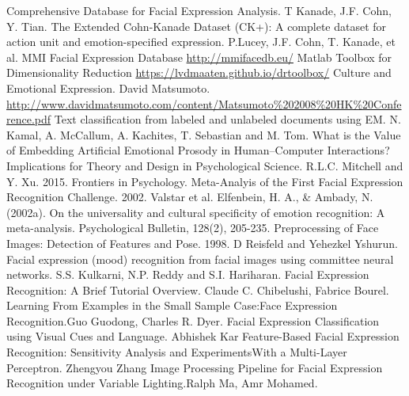 \documentclass[10pt,twocolumn,letterpaper]{article}
\begin{document}
\begin{thebibliography}{1}
 Comprehensive Database for Facial Expression Analysis. T Kanade, J.F. Cohn, Y. Tian.
 The Extended Cohn-Kanade Dataset (CK+): A complete dataset for action unit and emotion-specified expression. P.Lucey, J.F. Cohn, T. Kanade, et al. 
 MMI Facial Expression Database \url{http://mmifacedb.eu/}
 Matlab Toolbox for Dimensionality Reduction \url{https://lvdmaaten.github.io/drtoolbox/}
 Culture and Emotional Expression. David Matsumoto. \url{http://www.davidmatsumoto.com/content/Matsumoto%202008%20HK%20Conference.pdf}
Text classification from labeled and unlabeled documents using EM. N. Kamal, A. McCallum, A. Kachites, T. Sebastian and M. Tom. 
 What is the Value of Embedding Artificial Emotional Prosody in Human–Computer Interactions? Implications for Theory and Design in Psychological Science. R.L.C. Mitchell and Y. Xu. 2015. Frontiers in Psychology.
 Meta-Analyis of the First Facial Expression Recognition Challenge. 2002. Valstar et al.
 Elfenbein, H. A., \& Ambady, N. (2002a). On the universality and cultural specificity of emotion recognition: A meta-analysis. Psychological Bulletin, 128(2), 205-235. 
 Preprocessing of Face Images: Detection of Features and Pose. 1998. D Reisfeld and Yehezkel Yshurun.
 Facial expression (mood) recognition from facial images using committee neural networks. S.S. Kulkarni, N.P. Reddy and S.I. Hariharan.
 Facial Expression Recognition: A Brief Tutorial Overview. Claude C. Chibelushi, Fabrice Bourel.
Learning From Examples in the Small Sample Case:Face Expression Recognition.Guo Guodong, Charles R. Dyer.
Facial Expression Classification using Visual Cues and Language. Abhishek Kar
Feature-Based Facial Expression Recognition: Sensitivity Analysis and ExperimentsWith a Multi-Layer Perceptron. Zhengyou Zhang
Image Processing Pipeline for Facial Expression Recognition under Variable Lighting.Ralph Ma, Amr Mohamed.

\end{thebibliography}
\end{document}
